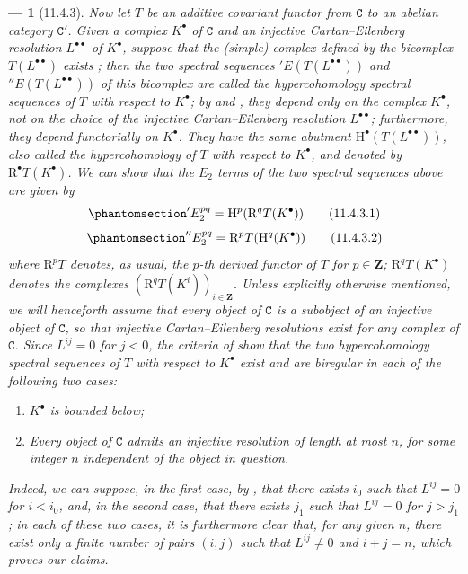 \documentclass[oneside]{amsart}
\theoremstyle{ega-env-style}
\newtheorem*{env}{---}
\theoremstyle{ega-thm-env-style}
\theoremstyle{ega-defn-env-style}
\def\bb{\mathbf}                    %
\def\cat{\mathtt}                   %
\def\HH{\mathrm{H}}                 %
\def\RR{\mathrm{R}}                 %
\newcommand{\oldpage}[2][]{{\marginnote{\normalfont{\textbf{#1}~|~#2}}}\ignorespaces}
\let\EGAOriginalLabel\label
\renewcommand{\label}[1]{\phantomsection\EGAOriginalLabel{#1}}
\begin{document}
\begin{env}[11.4.3]
\label{0.11.4.3}
Now let $T$ be an \emph{additive covariant functor} from $\cat{C}$ to an abelian category $\cat{C'}$.
Given a complex $K^\bullet$ of $\cat{C}$ and an \emph{injective} Cartan--Eilenberg resolution $L^{\bullet\bullet}$ of $K^{\bullet}$, suppose that the (simple) complex defined by the bicomplex $T(L^{\bullet\bullet})$ exists ;
then the two spectral sequences $'E(T(L^{\bullet\bullet}))$ and $''E(T(L^{\bullet\bullet}))$ of this bicomplex are called the \emph{hypercohomology spectral sequences} of $T$ with respect to $K^\bullet$;
by  and , they depend only on the complex $K^\bullet$, not on the choice of the injective Cartan--Eilenberg resolution $L^{\bullet\bullet}$;
furthermore, they depend \emph{functorially} on $K^\bullet$.
They have the same abutment $\HH^\bullet(T(L^{\bullet\bullet}))$, also called the \emph{hypercohomology} of $T$ with respect to $K^\bullet$, and denoted by $\RR^\bullet T(K^\bullet)$.
We can show that the $E_2$ terms of the two spectral sequences above are given by 
\[
\label{0.11.4.3.1}
  'E_2^{pq}
  = \HH^p(\RR^q T(K^\bullet))
\tag{11.4.3.1}
\]
\[
\label{0.11.4.3.2}
  ''E_2^{pq}
  = \RR^p T(\HH^q(K^\bullet))
\tag{11.4.3.2}
\]
\oldpage[0\textsubscript{III}]{34}
where $\RR^p T$ denotes, as usual, the $p$-th \emph{derived functor} of $T$ for $p\in\bb{Z}$;
$\RR^q T(K^\bullet)$ denotes the complexes $(\RR^q T(K^i))_{i\in\bb{Z}}$.
\label{0.11.4.4}
Unless explicitly otherwise mentioned, we will henceforth assume that every object of $\cat{C}$ is a subobject of an injective object of $\cat{C}$, so that injective Cartan--Eilenberg resolutions exist for any complex of $\cat{C}$.
Since $L^{ij}=0$ for $j<0$, the criteria of  show that the \emph{two} hypercohomology spectral sequences of $T$ with respect to $K^\bullet$ exist and are \emph{biregular} in each of the following two cases:
\begin{enumerate}
  \item $K^\bullet$ is bounded below;
  \item Every object of $\cat{C}$ admits an injective resolution of length at most $n$, for some integer $n$ independent of the object in question.
\end{enumerate}
Indeed, we can suppose, in the first case, by , that there exists $i_0$ such that $L^{ij}=0$ for $i<i_0$, and, in the second case, that there exists $j_1$ such that $L^{ij}=0$ for $j>j_1$;
in each of these two cases, it is furthermore clear that, for any given $n$, there exist only a finite number of pairs $(i,j)$ such that $L^{ij}\neq 0$ and $i+j=n$, which proves our claims.


\end{env}
\end{document}
